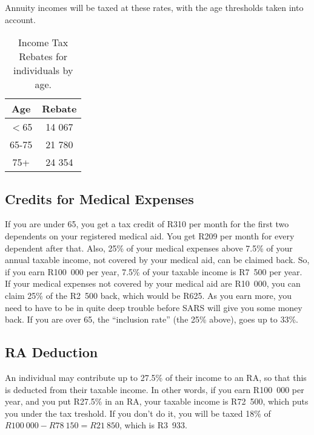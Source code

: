 \documentclass[a4paper, justified]{tufte-handout}
\begin{document}
Annuity incomes will be taxed at these rates, with the age thresholds taken into account.

\begin{table}[]
	\centering
	\caption{Income Tax Rebates for individuals by age.}
	\label{tab:rebates}
	\begin{tabular}{cc}
		\toprule
		\textbf{Age}           & \textbf{Rebate} \\
		\midrule
		$<$65 & 14 067 \\
		65-75         & 21 780 \\
		75+           & 24 354\\
		\bottomrule
	\end{tabular}
\end{table}

\subsection{Credits for Medical Expenses}
If you are under 65, you get a tax credit of R310 per month for the first two dependents on your registered medical aid. You get R209 per month for every dependent after that. Also, 25\% of your medical expenses above 7.5\% of your annual taxable income, not covered by your medical aid, can be claimed back. So, if you earn R100~000 per year, 7.5\% of your taxable income is R7~500 per year. If your  medical expenses not covered by your medical aid are R10~000, you can claim 25\% of the R2~500 back, which would be R625. As you earn more, you need to have to be in quite deep trouble before SARS will give you some money back.
If you are over 65, the ``inclusion rate'' (the 25\% above), goes up to 33\%.

\subsection{RA Deduction}
An individual may contribute up to 27.5\% of their income to an RA, so that this is deducted from their taxable income. In other words, if you earn R100~000 per year, and you put R27.5\% in an RA, your taxable income is R72~500, which puts you under the tax treshold. If you don't do it, you will be taxed 18\% of $R100~000-R78~150 = R21~850$, which is R3~933.
\end{document}

